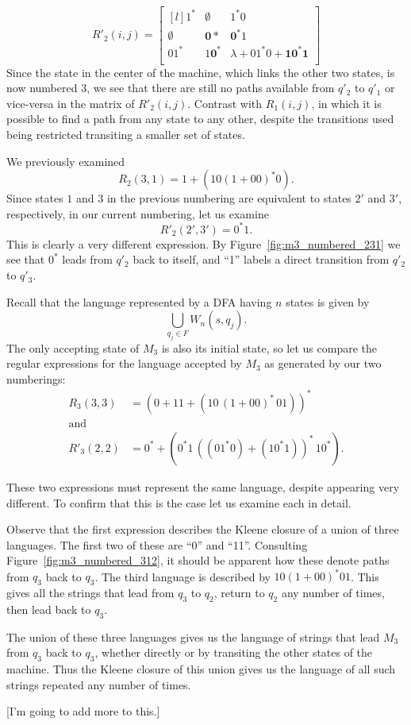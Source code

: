 \documentclass{bcthesis}
\begin{document}
\begin{example}
		\[
			R'_2 (i, j) = 
			\begin{bmatrix*}[l]
				1^*			& \emptyset		& 1^*0 										\\
				\emptyset 	& \bm{0*}		& \bm{0^*}1									\\
				01^* 		& 1\bm{0^*} 	& \lambda + 01^*0 + \bm{1 0^* 1} 			\\
			\end{bmatrix*}
		\]
		Since the state in the center of the machine, which links the other two states, is now numbered $3$, we see that there are still no paths available from $q'_2$ to $q'_1$ or vice-versa in the matrix of $R'_2(i, j)$.
		Contrast with $R_1 (i, j)$, in which it is possible to find a path from any state to any other, despite the transitions used being restricted transiting a smaller set of states.

		We previously examined
		\[
			R_2(3, 1) = 1 + (10 (1 + 00)^* 0).
		\]
		Since states $1$ and $3$ in the previous numbering are equivalent to states $2'$ and $3'$, respectively, in our current numbering, let us examine
		\[
			R'_2(2', 3') = 0^*1.
		\]
		This is clearly a very different expression.
		By Figure~\ref{fig:m3_numbered_231} we see that $0^*$ leads from $q'_2$ back to itself, and ``1'' labels a direct transition from $q'_2$ to $q'_3$.

		Recall that the language represented by a DFA having $n$ states is given by 
		\[
			\bigcup_{q_j \in F} W_n(s, q_j).
		\]
		The only accepting state of $M_3$ is also its initial state, so let us compare the regular expressions for the language accepted by $M_3$ as generated by our two numberings:
		\begin{align*}
			R_3(3, 3) &= (0+11+(10 \, (1+00)^* \, 01))^* \\
			\text{and} \\
			R'_3(2, 2) &= 0^* + (0^*1 \, ((01^*0) + (10^*1))^* \, 10^*).
		\end{align*}

		These two expressions must represent the same language, despite appearing very different.
		To confirm that this is the case let us examine each in detail.

		Observe that the first expression describes the Kleene closure of a union of three languages.
		The first two of these are ``0'' and ``11''.
		Consulting Figure~\ref{fig:m3_numbered_312}, it should be apparent how these denote paths from $q_3$ back to $q_3$.
		The third language is described by $10 (1+00)^* 01$.
		This gives all the strings that lead from $q_3$ to $q_2$, return to $q_2$ any number of times, then lead back to $q_3$.

		The union of these three languages gives us the language of strings that lead $M_3$ from $q_3$ back to $q_3$, whether directly or by transiting the other states of the machine. 
		Thus the Kleene closure of this union gives us the language of all such strings repeated any number of times.

		[I'm going to add more to this.]



	\end{example}
\end{document}
